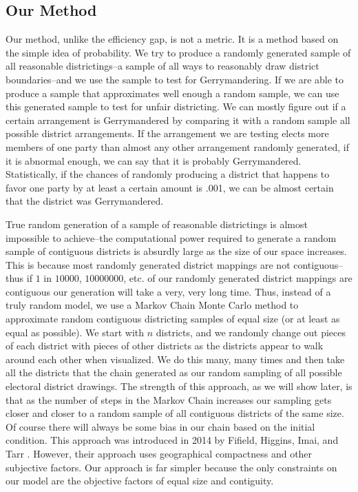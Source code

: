 \documentclass[12pt]{article}
\begin{document}
    \subsection{Our Method}
    Our method, unlike the efficiency gap, is not a metric. It is a method based on the simple idea of probability. We try to produce a randomly generated sample of all reasonable districtings--a sample of all ways to reasonably draw district boundaries--and we use the sample to test for Gerrymandering. If we are able to produce a sample that approximates well enough a random sample, we can use this generated sample to test for unfair districting. We can mostly figure out if a certain arrangement is Gerrymandered by comparing it with a random sample all possible district arrangements. If the arrangement we are testing elects more members of one party than almost any other arrangement randomly generated, if it is abnormal enough, we can say that it is probably Gerrymandered. Statistically, if the chances of randomly producing a district that happens to favor one party by at least a certain amount is .001, we can be almost certain that the district was Gerrymandered.
    \par
    True random generation of a sample of reasonable districtings is almost impossible to achieve--the computational power required to generate a random sample of contiguous districts is absurdly large as the size of our space increases. This is because most randomly generated district mappings are not contiguous--thus if $1$ in $10000$, $10000000$, \frenchspacing etc. \nonfrenchspacing of our randomly generated district mappings are contiguous our generation will take a very, very long time. Thus, instead of a truly random model, we use a Markov Chain Monte Carlo method to approximate random contiguous districting samples of equal size (or at least as equal as possible). We start with $n$ districts, and we randomly change out pieces of each district with pieces of other districts as the districts appear to walk around each other when visualized. We do this many, many times and then take all the districts that the chain generated as our random sampling of all possible electoral district drawings. The strength of this approach, as we will show later, is that as the number of steps in the Markov Chain increases our sampling gets closer and closer to a random sample of all contiguous districts of the same size. Of course there will always be some bias in our chain based on the initial condition. This approach was introduced in 2014 by Fifield, Higgins, Imai, and Tarr \cite{Harv}. However, their approach uses geographical compactness and other subjective factors. Our approach is far simpler because the only constraints on our model are the objective factors of equal size and contiguity. 
    
\end{document}
